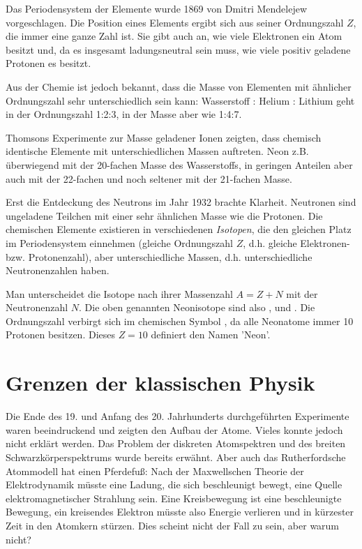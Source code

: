 Das Periodensystem der Elemente wurde 1869 von Dmitri Mendelejew vorgeschlagen. Die Position eines Elements ergibt sich aus seiner Ordnungszahl $Z$, die immer eine ganze Zahl ist. Sie gibt auch an, wie viele Elektronen ein Atom besitzt und, da es insgesamt ladungsneutral sein muss, wie viele positiv geladene Protonen es besitzt. 

Aus der Chemie ist jedoch bekannt, dass die Masse von Elementen mit ähnlicher Ordnungszahl sehr unterschiedlich sein kann: Wasserstoff : Helium : Lithium geht in der Ordnungszahl 1:2:3, in der Masse aber wie 1:4:7.

Thomsons Experimente zur Masse geladener Ionen zeigten, dass chemisch identische Elemente mit unterschiedlichen Massen auftreten. Neon z.B. überwiegend mit der 20-fachen Masse des Wasserstoffs, in geringen Anteilen aber auch mit der 22-fachen und noch seltener mit der 21-fachen Masse.

Erst die Entdeckung des Neutrons im Jahr 1932 brachte Klarheit. Neutronen sind ungeladene Teilchen mit einer sehr ähnlichen Masse wie die Protonen. Die chemischen Elemente existieren in verschiedenen \emph{Isotopen}, die den gleichen Platz im Periodensystem einnehmen (gleiche Ordnungszahl $Z$, d.h. gleiche Elektronen- bzw. Protonenzahl), aber unterschiedliche Massen, d.h. unterschiedliche Neutronenzahlen haben.

Man unterscheidet die Isotope nach ihrer Massenzahl $A = Z + N$ mit der Neutronenzahl $N$. Die oben genannten Neonisotope sind also ,  und . Die Ordnungszahl verbirgt sich im chemischen Symbol , da alle Neonatome immer 10 Protonen besitzen. Dieses $Z=10$ definiert den Namen 'Neon'.


\section{Grenzen der klassischen Physik}

Die Ende des 19. und Anfang des 20. Jahrhunderts durchgeführten Experimente waren beeindruckend und zeigten den Aufbau der Atome. Vieles konnte jedoch nicht erklärt werden. Das Problem der diskreten Atomspektren und des breiten Schwarzkörperspektrums wurde bereits erwähnt. Aber auch das Rutherfordsche Atommodell hat einen Pferdefuß: Nach der Maxwellschen Theorie der Elektrodynamik müsste eine Ladung, die sich beschleunigt bewegt, eine Quelle elektromagnetischer Strahlung sein. Eine Kreisbewegung ist eine beschleunigte Bewegung, ein kreisendes Elektron müsste also Energie verlieren und in kürzester Zeit in den Atomkern stürzen. Dies scheint nicht der Fall zu sein, aber warum nicht?

